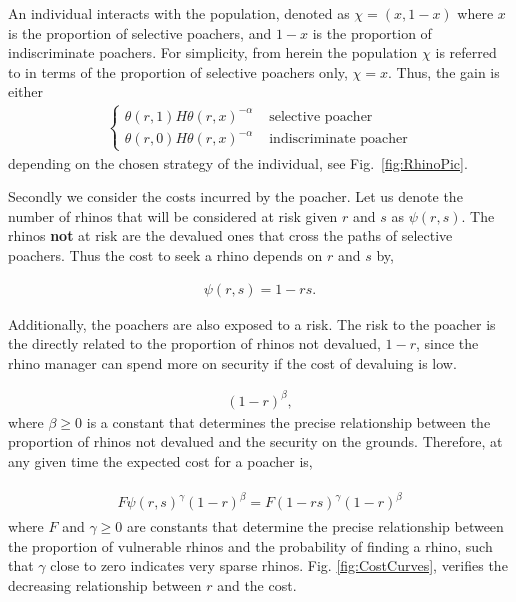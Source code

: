 \documentclass[10pt]{article}
\begin{document}
An individual interacts with the population, denoted as \(\chi=(x,1-x)\) where $x$ is the proportion of selective poachers, and $1-x$ is the proportion of indiscriminate poachers. For simplicity, from herein the population $\chi$ is referred to in terms of the proportion of selective poachers only, $\chi=x$. Thus,
the gain is either
\begin{eqnarray}
    \label{eqn:gain}
    \left\{
    \begin{array}{cl}
    \theta(r, 1) H \theta(r, x)^{-\alpha} & \mbox{ selective poacher}
    \\
    \theta(r, 0) H \theta(r, x)^{-\alpha} & \mbox{ indiscriminate poacher}
    \end{array} \right.
\end{eqnarray}
depending on the chosen strategy of the individual, see Fig.~\ref{fig:RhinoPic}.

Secondly we consider the costs incurred by the poacher. Let us denote the number
of rhinos that will be considered at risk given \(r\) and \(s\) as \(\psi(r,s)\).
The rhinos \textbf{not} at risk are the devalued ones 
that cross the paths of selective poachers. Thus the cost to seek a rhino depends on $r$ and $s$ by,

\begin{eqnarray}
    \label{eqn:psi}
    \psi(r, s) = 1 - rs.
\end{eqnarray}

Additionally, the poachers are also exposed to a risk. The risk to the poacher is
the directly related to the proportion of rhinos not devalued, \(1-r\), since the rhino manager
can spend more on security if the cost of devaluing is low.

\begin{eqnarray}
    \label{eqn:risk}
    (1 - r)^{\beta},
\end{eqnarray}
where \(\beta \geq 0\) is a constant that determines the precise relationship between
the proportion of rhinos not devalued and the security on the grounds. Therefore,
at any given time the expected cost for a poacher is, 

\begin{eqnarray}
    \label{eqn:individual_cost}
    \begin{array}{l}
    F \psi(r, s)^{\gamma} (1 - r)^{\beta} = F (1 - rs) ^{\gamma} (1 - r) ^{\beta}
    \end{array}
\end{eqnarray}
where \(F\) and \(\gamma \geq 0\) are constants that determine the precise relationship
between the proportion of vulnerable rhinos and the probability of finding a rhino,
such that \(\gamma\) close to zero indicates very sparse rhinos. Fig.
\ref{fig:CostCurves},  verifies the decreasing relationship between \(r\) and the
cost.
\end{document}
